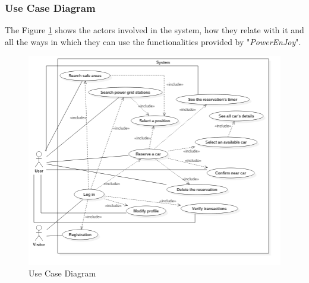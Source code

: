 \subsubsection{Use Case Diagram}

The Figure \ref{fig:use case} shows the actors involved in the system, how they relate with it and all the ways in which they can use the functionalities provided by "\textit{PowerEnJoy}".  


\begin{figure}[htbp]
\centering
\includegraphics[width=\textwidth]{Images/UML/UseCase}
\caption{Use Case Diagram}
\label{fig:use case}
\end{figure}
\clearpage

